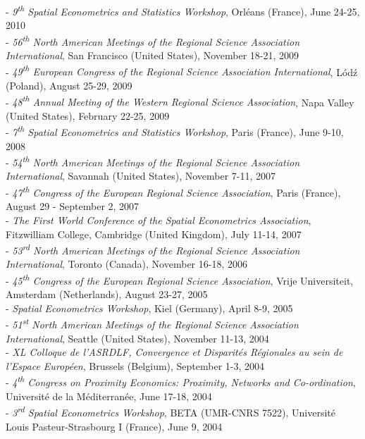 \documentclass[a4paper,12pt]{article}
\begin{document}
- \textit{9\textsuperscript{th} Spatial Econometrics and Statistics Workshop}, Orléans (France), June 24-25, 2010 \\
- \textit{56\textsuperscript{th} North American Meetings of the Regional Science Association International}, San Francisco (United States), November 18-21, 2009 \\
- \textit{49\textsuperscript{th} European Congress of the Regional Science Association International}, Lód\'z (Poland), August 25-29, 2009 \\
- \textit{48\textsuperscript{th} Annual Meeting of the Western Regional Science Association}, Napa Valley (United States), February 22-25, 2009 \\
- \textit{7\textsuperscript{th} Spatial Econometrics and Statistics Workshop}, Paris (France), June 9-10, 2008 \\
- \textit{54\textsuperscript{th} North American Meetings of the Regional Science Association International}, Savannah (United States), November 7-11, 2007 \\
- \textit{47\textsuperscript{th} Congress of the European Regional Science Association}, Paris (France), August 29 - September 2, 2007 \\
- \textit{The First World Conference of the Spatial Econometrics Association}, Fitzwilliam College, Cambridge (United Kingdom), July 11-14, 2007 \\
- \textit{53\textsuperscript{rd} North American Meetings of the Regional Science Association International}, Toronto (Canada), November 16-18, 2006 \\
- \textit{45\textsuperscript{th} Congress of the European Regional Science Association}, Vrije Universiteit, Amsterdam (Netherlands), August 23-27, 2005 \\
- \textit{Spatial Econometrics Workshop}, Kiel (Germany), April 8-9, 2005 \\
- \textit{51\textsuperscript{st} North American Meetings of the Regional Science Association International}, Seattle (United States), November 11-13, 2004 \\
- \textit{XL\ieme{} Colloque de l'ASRDLF, Convergence et Disparités Régionales au sein de l'Espace Européen}, Brussels (Belgium), September 1-3, 2004 \\
- \textit{4\textsuperscript{th} Congress on Proximity Economics: Proximity, Networks and Co-ordination}, Université de la Méditerranée, June 17-18, 2004 \\
- \textit{3\textsuperscript{rd} Spatial Econometrics Workshop}, BETA (UMR-CNRS 7522), Université Louis Pasteur-Strasbourg I (France), June 9, 2004 \\
\end{document}
